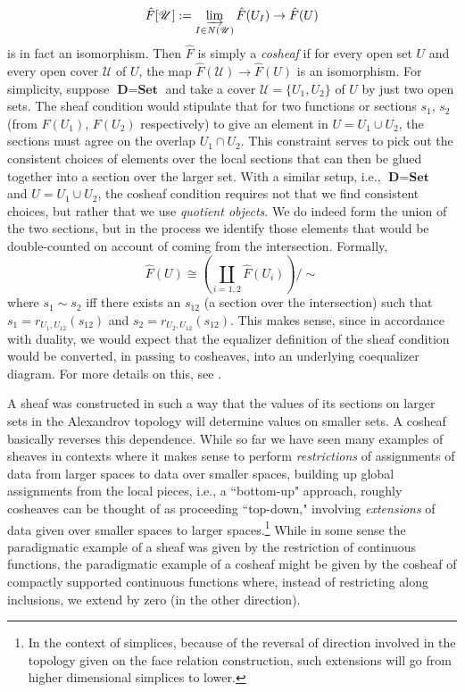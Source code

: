 \documentclass[a4paper]{book}
\theoremstyle{definition}
\theoremstyle{definition}
\theoremstyle{definition}
\theoremstyle{theorem}
\theoremstyle{definition}
\begin{document}
{	\begin{equation}
	\hat{F}[\mathscr{U}] := \varinjlim_{I \in N(\mathscr{U})} \hat{F}(U_I) \rightarrow \hat{F}(U)
	\end{equation} 
	is in fact an isomorphism. Then $\hat{F}$ is simply a \textit{cosheaf} if for every open set $U$ and every open cover $\mathscr{U}$ of $U$, the map $\hat{F}(\mathscr{U}) \rightarrow \hat{F}(U)$ is an isomorphism. For simplicity, suppose $\textbf{D} = \textbf{Set}$ and take a cover $\mathscr{U} = \{U_1, U_2\}$ of $U$ by just two open sets. The sheaf condition would stipulate that for two functions or sections $s_1$, $s_2$ (from $F(U_1)$, $F(U_2)$ respectively) to give an element in $U = U_1 \cup U_2$, the sections must agree on the overlap $U_1 \cap U_2$. This constraint serves to pick out the consistent choices of elements over the local sections that can then be glued together into a section over the larger set. With a similar setup, i.e., $\textbf{D} = \textbf{Set}$ and $U = U_1 \cup U_2$, the cosheaf condition requires not that we find consistent choices, but rather that we use \textit{quotient objects}. We do indeed form the union of the two sections, but in the process we identify those elements that would be double-counted on account of coming from the intersection. Formally, 
	\begin{equation}
	\hat{F}(U) \cong (\coprod_{i = 1,2} \hat{F}(U_i)) / \sim 
	\end{equation}
	where $s_1 \sim s_2$ iff there exists an $s_{12}$ (a section over the intersection) such that $s_1 = r_{U_1, U_{12}}(s_{12})$ and $s_2 = r_{U_2, U_{12}}(s_{12})$. This makes sense, since in accordance with duality, we would expect that the equalizer definition of the sheaf condition would be converted, in passing to cosheaves, into an underlying coequalizer diagram. For more details on this, see \cite{curry_sheaves_2013}.} 
	\par 
A sheaf was constructed in such a way that the values of its sections on larger sets in the Alexandrov topology will determine values on smaller sets. A cosheaf basically reverses this dependence. While so far we have seen many examples of sheaves in contexts where it makes sense to perform \textit{restrictions} of assignments of data from larger spaces to data over smaller spaces, building up global assignments from the local pieces, i.e., a ``bottom-up" approach, roughly cosheaves can be thought of as proceeding ``top-down," involving \textit{extensions} of data given over smaller spaces to larger spaces.\footnote{In the context of simplices, because of the reversal of direction involved in the topology given on the face relation construction, such extensions will go from higher dimensional simplices to lower.} While in some sense the paradigmatic example of a sheaf was given by the restriction of continuous functions, the paradigmatic example of a cosheaf might be given by the cosheaf of compactly supported continuous functions where, instead of restricting along inclusions, we extend by zero (in the other direction).\par 
\end{document}

